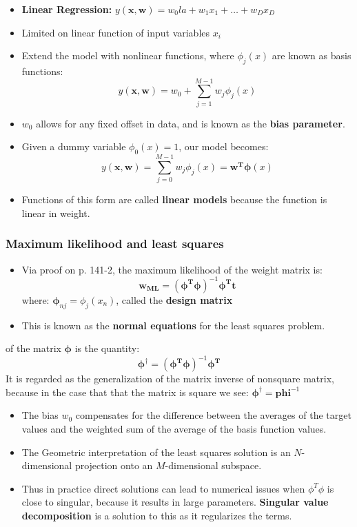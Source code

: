 \begin{itemize}[--]
	\item \textbf{Linear Regression:} $y(\mathbf{x}, \mathbf{w})=w_0la+w_1 x_1+\ldots +w_D x_D$
	\item Limited on linear function of input variables $x_i$
	\item Extend the model with nonlinear functions, where $\phi_j (x)$ are known as basis functions:
		$$y(\mathbf{x}, \mathbf{w})=w_0 +\sum_{j=1}^{M-1}w_j\phi_j (x)$$
	\item $w_0$ allows for any fixed offset in data, and is known as the \textbf{bias parameter}.
	\item Given a dummy variable $\phi_0 (x)=1$, our model becomes:
		$$y(\mathbf{x}, \mathbf{w})=\sum_{j=0}^{M-1}w_j\phi_j (x)=\mathbf{w}^\mathbf{T} \mathbf{\phi} (x)$$
	\item Functions of this form are called \textbf{linear models} because the function is linear in weight.
\end{itemize}

\subsubsection{Maximum likelihood and least squares}
\begin{itemize}[--]
	\item Via proof on p. 141-2, the maximum likelihood of the weight matrix is: $$\mathbf{w}_{\mathbf{ML}}=(\mathbf{\phi}^{\mathbf{T}}\mathbf{\phi})^{-1}\mathbf{\phi}^{\mathbf{T}}\mathbf{t}$$
	where: $\mathbf{\phi}_{nj}=\phi_{j} (x_{n})$, called the \textbf{design matrix}
	\item This is known as the \textbf{normal equations} for the least squares problem.
\end{itemize}

\begin{theorem}
	of the matrix $\mathbf{\phi}$ is the quantity:
	$$\mathbf{\phi}^{\dagger}=(\mathbf{\phi}^{\mathbf{T}}\mathbf{\phi})^{-1}\mathbf{\phi}^{\mathbf{T}}$$
	It is regarded as the generalization of the matrix inverse of nonsquare matrix, because in the case that that the matrix is square we see: $\mathbf{\phi}^{\dagger}=\mathbf{phi}^{-1}$
\end{theorem}

\begin{itemize}[--]
	\item The bias $w_0$ compensates for the difference between the averages of the target values and the weighted sum of the average of the basis function values.
	\item The Geometric interpretation of the least squares solution is an $N$-dimensional projection onto an $M$-dimensional subspace.
	\item Thus in practice direct solutions can lead to numerical issues when $\phi^{T}\phi$ is close to singular, because it results in large parameters. \textbf{Singular value decomposition} is a solution to this as it regularizes the terms.
\end{itemize}

